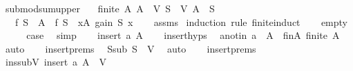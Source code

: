 \begin{isabellebody}
\begin{isamarkuptext}
\end{isamarkuptext}\isamarkuptrue%
\isamarkupfalse%
\ submod{\isacharunderscore}{\kern0pt}sum{\isacharunderscore}{\kern0pt}upper{\isacharcolon}{\kern0pt}\isanewline
\ \ \ {\isachardoublequoteopen}finite\ A{\isachardoublequoteclose}\ {\isachardoublequoteopen}A\ {\isasymsubseteq}\ V{\isachardoublequoteclose}\ {\isachardoublequoteopen}S\ {\isasymsubseteq}\ V{\isachardoublequoteclose}\ {\isachardoublequoteopen}A\ {\isasyminter}\ S\ {\isacharequal}{\kern0pt}\ {\isacharbraceleft}{\kern0pt}{\isacharbraceright}{\kern0pt}{\isachardoublequoteclose}\isanewline
\ \ \ {\isachardoublequoteopen}f\ {\isacharparenleft}{\kern0pt}S\ {\isasymunion}\ A{\isacharparenright}{\kern0pt}\ {\isacharminus}{\kern0pt}\ f\ S\ {\isasymle}\ {\isacharparenleft}{\kern0pt}{\isasymSum}x{\isasymin}A{\isachardot}{\kern0pt}\ gain\ S\ x{\isacharparenright}{\kern0pt}{\isachardoublequoteclose}\isanewline
%
\isadelimproof
\ \ %
\endisadelimproof
%
\isatagproof
{}\isamarkupfalse%
\ assms\isanewline
{}\isamarkupfalse%
\ {\isacharparenleft}{\kern0pt}induction\ rule{\isacharcolon}{\kern0pt}\ finite{\isacharunderscore}{\kern0pt}induct{\isacharparenright}{\kern0pt}\isanewline
\ \ \isamarkupfalse%
\ empty\isanewline
\ \ \isamarkupfalse%
\ \isamarkupfalse%
\ {\isacharquery}{\kern0pt}case\ \isamarkupfalse%
\ simp\isanewline
{}\isamarkupfalse%
\isanewline
\ \ \isamarkupfalse%
\ {\isacharparenleft}{\kern0pt}insert\ a\ A{\isacharparenright}{\kern0pt}\isanewline
\ \ \isamarkupfalse%
\ insert{\isachardot}{\kern0pt}hyps\ \isamarkupfalse%
\ a{\isacharunderscore}{\kern0pt}notin{\isacharcolon}{\kern0pt}\ {\isachardoublequoteopen}a\ {\isasymnotin}\ A{\isachardoublequoteclose}\ \ finA{\isacharcolon}{\kern0pt}\ {\isachardoublequoteopen}finite\ A{\isachardoublequoteclose}\ \isamarkupfalse%
\ auto\isanewline
\isanewline
\ \ \isamarkupfalse%
\ insert{\isachardot}{\kern0pt}prems\ \isamarkupfalse%
\ S{\isacharunderscore}{\kern0pt}sub{\isacharcolon}{\kern0pt}\ {\isachardoublequoteopen}S\ {\isasymsubseteq}\ V{\isachardoublequoteclose}\ \isamarkupfalse%
\ auto\isanewline
\ \ \isamarkupfalse%
\ insert{\isachardot}{\kern0pt}prems\ \isamarkupfalse%
\ ins{\isacharunderscore}{\kern0pt}subV{\isacharcolon}{\kern0pt}\ {\isachardoublequoteopen}insert\ a\ A\ {\isasymsubseteq}\ V{\isachardoublequoteclose}\ \isamarkupfalse%

\end{isabellebody}
